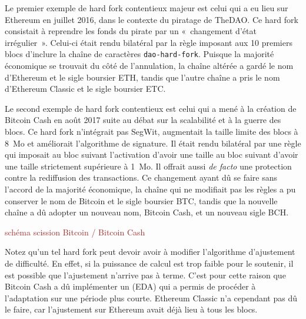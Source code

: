 Le premier exemple de hard fork contentieux majeur est celui qui a eu lieu sur Ethereum en juillet 2016, dans le contexte du piratage de TheDAO. Ce hard fork consistait à reprendre les fonds du pirate par un «~changement d'état irrégulier~». Celui-ci était rendu bilatéral par la règle imposant aux 10 premiers blocs d'inclure la chaîne de caractères \texttt{dao-hard-fork}. Puisque la majorité économique se trouvait du côté de l'annulation, la chaîne altérée a gardé le nom d'Ethereum et le sigle boursier ETH, tandis que l'autre chaîne a pris le nom d'Ethereum Classic et le sigle boursier ETC.

Le second exemple de hard fork contentieux est celui qui a mené à la création de Bitcoin Cash en août 2017 suite au débat sur la scalabilité et à la guerre des blocs. Ce hard fork n'intégrait pas SegWit, augmentait la taille limite des blocs à 8~Mo et améliorait l'algorithme de signature. Il était rendu bilatéral par une règle qui imposait au bloc suivant l'activation d'avoir une taille au bloc suivant d'avoir une taille strictement supérieure à 1~Mo. Il offrait aussi \emph{de facto} une protection contre la rediffusion des transactions. Ce changement ayant dû se faire sans l'accord de la majorité économique, la chaîne qui ne modifiait pas les règles a pu conserver le nom de Bitcoin et le sigle boursier BTC, tandis que la nouvelle chaîne a dû adopter un nouveau nom, Bitcoin Cash, et un nouveau sigle BCH.

\textcolor{brown}{schéma scission Bitcoin / Bitcoin Cash}

Notez qu'un tel hard fork peut devoir avoir à modifier l'algorithme d'ajustement de difficulté. En effet, si la puissance de calcul est trop faible pour le soutenir, il est possible que l'ajustement n'arrive pas à terme. C'est pour cette raison que Bitcoin Cash a dû implémenter un  (EDA) qui a permis de procéder à l'adaptation sur une période plus courte. Ethereum Classic n'a cependant pas dû le faire, car l'ajustement sur Ethereum avait déjà lieu à tous les blocs.

